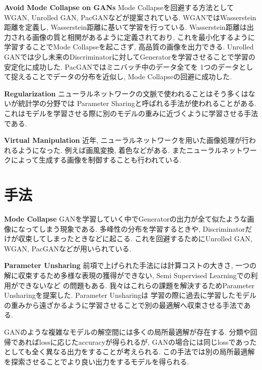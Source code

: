 \documentclass[techrep, submit, noauthor,preface]{ipsj}
\begin{document}
{\bf Avoid Mode Collapse on GANs} Mode Collapseを回避する方法としてWGAN\cite{wgan}, Unrolled GAN\cite{unrolled}, PacGAN\cite{pacgan}などが提案されている.
WGANではWasserstein距離を定義し, Wasserstein距離に基いて学習を行っている.
Wasserstein距離は出力される画像の質と相関があるように定義されており, これを最小化するように学習することでMode Collapseを起こさず, 高品質の画像を出力できる.
Unrolled GANでは少し未来のDiscriminatorに対してGeneratorを学習させることで学習の安定化に成功した.
PacGANではミニバッチ中のデータ全てを
1つのデータとして捉えることでデータの分布を近似し, Mode Collapseの回避に成功した.

{\bf Regularization} ニューラルネットワークの文脈で使われることはそう多くはないが統計学の分野では
Parameter Sharing\cite{deeplearningbook}と呼ばれる手法が使われることがある.
これはモデルを学習させる際に別のモデルの重みに近づくように学習させる手法である.

{\bf Virtual Manipulation} 近年, ニューラルネットワークを用いた画像処理が行われるようになった.
例えば画風変換\cite{style}, 着色\cite{inpaint}などがある. またニューラルネットワークによって生成する画像を制御することも行われている\cite{pix2pixhd}.

\section{手法}

{\bf Mode Collapse} GANを学習していく中でGeneratorの出力が全て似たような画像になってしまう現象である.
多峰性の分布を学習するときや, Discriminatorだけが収束してしまったときなどに起こる.
これを回避するためにUnrolled GAN\cite{unrolled}, WGAN\cite{wgan}, PacGAN\cite{pacgan}などが用いられている.

{\bf Parameter Unsharing} 前項で上げられた手法には計算コストの大きさ, 一つの解に収束するため多様な表現の獲得ができない, Semi Supervised Learningでの利用ができないなど
の問題もある. 我々はこれらの課題を解決するためParameter Unsharingを提案した.
Parameter Unsharingは
学習の際に過去に学習したモデルの重みから遠ざかるように学習させることで別の最適解へ収束させる手法である.

GANのような複雑なモデルの解空間には多くの局所最適解が存在する.
分類や回帰であればlossに応じたaccuracyが得られるが, 
GANの場合には同じlossであったとしても全く異なる出力をすることが考えられる. 
この手法では別の局所最適解を探索させることでより良い出力をするモデルを得られる.
\end{document}
